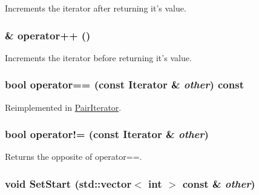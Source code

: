 Increments the iterator after returning it's value. \hypertarget{classJKBuilder_1_1Iterator_ae1f21c74128a5ef5d1b9de72ceb09be8}{
\subsubsection[{operator++}]{ \& operator++ ()}}
\label{classJKBuilder_1_1Iterator_ae1f21c74128a5ef5d1b9de72ceb09be8}


Increments the iterator before returning it's value. \hypertarget{classJKBuilder_1_1Iterator_a1ea001976a5bc8ae8dc365e2a912b59a}{
\subsubsection[{operator==}]{\setlength{\rightskip}{0pt plus 5cm}bool operator== (const {\bf Iterator} \& {\em other}) const}}
\label{classJKBuilder_1_1Iterator_a1ea001976a5bc8ae8dc365e2a912b59a}


Reimplemented in \hyperlink{classJKBuilder_1_1PairIterator_a6b4e430066f478e5e400edd39ef93968}{PairIterator}.\hypertarget{classJKBuilder_1_1Iterator_a8c06af8ae0d9d1614ae9f81629275926}{
\subsubsection[{operator!=}]{\setlength{\rightskip}{0pt plus 5cm}bool operator!= (const {\bf Iterator} \& {\em other})}}
\label{classJKBuilder_1_1Iterator_a8c06af8ae0d9d1614ae9f81629275926}


Returns the opposite of operator==. \hypertarget{classJKBuilder_1_1Iterator_aa83de505e29125c1d3ac7bb1b13ca15a}{
\subsubsection[{SetStart}]{\setlength{\rightskip}{0pt plus 5cm}void SetStart (std::vector$<$ int $>$ const \& {\em other})}}
\label{classJKBuilder_1_1Iterator_aa83de505e29125c1d3ac7bb1b13ca15a}


